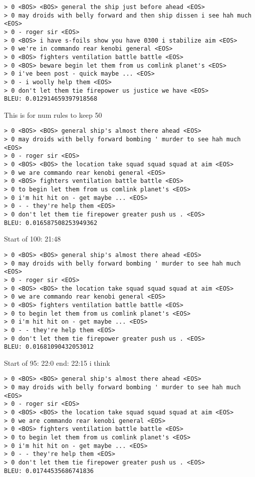 \documentclass{article}
\begin{document}
\begin{verbatim}
> 0 <BOS> <BOS> general the ship just before ahead <EOS>
> 0 may droids with belly forward and then ship dissen i see hah much <EOS>
> 0 - roger sir <EOS>
> 0 <BOS> i have s-foils show you have 0300 i stabilize aim <EOS>
> 0 we're in commando rear kenobi general <EOS>
> 0 <BOS> fighters ventilation battle battle <EOS>
> 0 <BOS> beware begin let them from us comlink planet's <EOS>
> 0 i've been post - quick maybe ... <EOS>
> 0 - i woolly help them <EOS>
> 0 don't let them tie firepower us justice we have <EOS>
BLEU: 0.012914659397918568
\end{verbatim}

This is for num rules to keep 50
\begin{verbatim}
> 0 <BOS> <BOS> general ship's almost there ahead <EOS>
> 0 may droids with belly forward bombing ' murder to see hah much <EOS>
> 0 - roger sir <EOS>
> 0 <BOS> <BOS> the location take squad squad squad at aim <EOS>
> 0 we are commando rear kenobi general <EOS>
> 0 <BOS> fighters ventilation battle battle <EOS>
> 0 to begin let them from us comlink planet's <EOS>
> 0 i'm hit hit on - get maybe ... <EOS>
> 0 - - they're help them <EOS>
> 0 don't let them tie firepower greater push us . <EOS>
BLEU: 0.016587508253949362
\end{verbatim}

Start of 100: 21:48
\begin{verbatim}
> 0 <BOS> <BOS> general ship's almost there ahead <EOS>
> 0 may droids with belly forward bombing ' murder to see hah much <EOS>
> 0 - roger sir <EOS>
> 0 <BOS> <BOS> the location take squad squad squad at aim <EOS>
> 0 we are commando rear kenobi general <EOS>
> 0 <BOS> fighters ventilation battle battle <EOS>
> 0 to begin let them from us comlink planet's <EOS>
> 0 i'm hit hit on - get maybe ... <EOS>
> 0 - - they're help them <EOS>
> 0 don't let them tie firepower greater push us . <EOS>
BLEU: 0.01681090432053012
\end{verbatim}

Start of 95: 22:0 end: 22:15 i think
\begin{verbatim}
> 0 <BOS> <BOS> general ship's almost there ahead <EOS>
> 0 may droids with belly forward bombing ' murder to see hah much <EOS>
> 0 - roger sir <EOS>
> 0 <BOS> <BOS> the location take squad squad squad at aim <EOS>
> 0 we are commando rear kenobi general <EOS>
> 0 <BOS> fighters ventilation battle battle <EOS>
> 0 to begin let them from us comlink planet's <EOS>
> 0 i'm hit hit on - get maybe ... <EOS>
> 0 - - they're help them <EOS>
> 0 don't let them tie firepower greater push us . <EOS>
BLEU: 0.01744535686741836
\end{verbatim}
\end{document}
